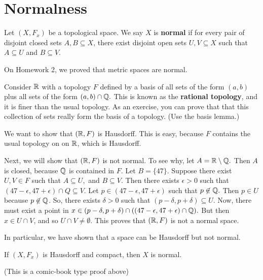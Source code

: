 

\section{Normalness}
\begin{definition}
	Let $(X,F_x)$ be a topological space. We say $X$ is \textbf{normal} if for every pair of disjoint closed sets $A,B \subseteq X$, there exist disjoint open sets $U,V\subseteq X$ such that $A \subseteq U$ and $B \subseteq V$. 
\end{definition}

On Homework 2, we proved that metric spaces are normal.
\begin{example}
	Consider $\mathbb R$ with a topology $F$ defined by a basis of all sets of the form $(a,b)$ plus all sets of the form $(a,b)\cap \mathbb Q.$ This is known as the \textbf{rational topology}, and it is finer than the usual topology. As an exercise, you can prove that that this collection of sets really form the basis of a topology. (Use the basis lemma.) 
\end{example}

We want to show that $(\mathbb R,F)$ is Hausdorff. This is easy, because $F$ contains the usual topology on on $\mathbb R$, which is Hausdorff. 

Next, we will show that $(\mathbb R,F)$ is not normal. To see why, let $A=\mathbb R\setminus\mathbb Q.$ Then $A$ is closed, because $\mathbb Q$ is contained in $F$. Let $B=\{47\}.$ Suppose there exist $U,V \in F$ such that $A \subseteq U,$ and $B \subseteq V$. Then there exists $\epsilon>0$ such that $(47-\epsilon,47+\epsilon)\cap Q \subseteq V$. Let $p \in (47-\epsilon,47+\epsilon)$ such that $p \not\in \mathbb Q.$ Then $p \in U$ because $p \not\in \mathbb Q$. So, there exists $\delta>0$ such that $(p-\delta,p+\delta) \subseteq U$. Now, there must exist a point in $x \in (p-\delta,p+\delta)\cap((47-\epsilon,47+\epsilon)\cap \mathbb Q).$ But then $x \in U \cap V$, and so $U \cap V \neq \emptyset$. This proves that $(\mathbb R,F)$ is not a normal space.

In particular, we have shown that a space can be Hausdorff but not normal. 
\begin{lemma}
	If $(X,F_x)$ is Hausdorff and compact, then $X$ is normal. 
\end{lemma}
\placeholder (This is a comic-book type proof above)

